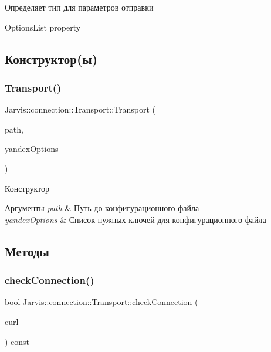 Определяет тип для параметров отправки 

Options\+List property 

\subsection{Конструктор(ы)}
\mbox{\label{classJarvis_1_1connection_1_1Transport_a2fce583b7c16902b5c2f4ad492371e2c}} 
\subsubsection{\texorpdfstring{Transport()}{Transport()}}
{\footnotesize\ttfamily Jarvis\+::connection\+::\+Transport\+::\+Transport (\begin{DoxyParamCaption}\item[{const j\+Path \&}]{path,  }\item[{const Options\+List\+::yandex\+Options}]{yandex\+Options }\end{DoxyParamCaption})\hspace{0.3cm}{\ttfamily [explicit]}}



Конструктор 


\begin{DoxyParams}{Аргументы}
{\em path} & Путь до конфигурационного файла \\
\hline
{\em yandex\+Options} & Список нужных ключей для конфигурационного файла \\
\hline
\end{DoxyParams}


\subsection{Методы}
\mbox{\label{classJarvis_1_1connection_1_1Transport_ae97760ea03453e9621027051c99a1c72}} 
\subsubsection{\texorpdfstring{check\+Connection()}{checkConnection()}}
{\footnotesize\ttfamily bool Jarvis\+::connection\+::\+Transport\+::check\+Connection (\begin{DoxyParamCaption}\item[{const socket $\ast$}]{curl }\end{DoxyParamCaption}) const}




